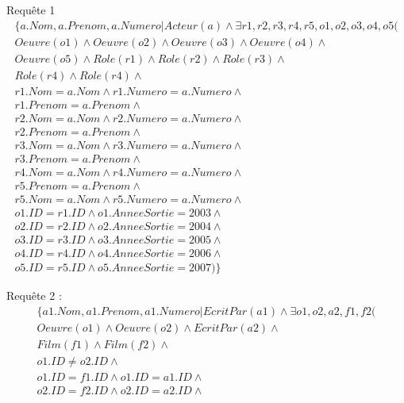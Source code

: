 \documentclass[10pt,a4paper]{article}
\begin{document}
\begin{list}{*}{}
\item Requête 1
\noindent
\[\begin{aligned}
      \{ a.Nom, a.Prenom, a.Numero | Acteur(a) \wedge \exists r1, r2, r3, r4, r5, o1, o2, o3, o4, o5 ( \\
       Oeuvre(o1) \wedge Oeuvre(o2) \wedge Oeuvre(o3) \wedge Oeuvre(o4) \wedge \\
       Oeuvre(o5) \wedge Role(r1) \wedge Role(r2) \wedge Role(r3) \wedge \\
       Role(r4) \wedge Role(r4)\wedge \\
       r1.Nom = a.Nom \wedge r1.Numero = a.Numero \wedge \\
       r1.Prenom = a.Prenom \wedge \\
       r2.Nom = a.Nom \wedge r2.Numero = a.Numero \wedge \\
       r2.Prenom = a.Prenom \wedge \\
       r3.Nom = a.Nom \wedge r3.Numero = a.Numero \wedge \\
       r3.Prenom = a.Prenom \wedge \\
       r4.Nom = a.Nom \wedge r4.Numero = a.Numero \wedge \\
       r5.Prenom = a.Prenom \wedge \\
       r5.Nom = a.Nom \wedge r5.Numero = a.Numero \wedge \\
       o1.ID = r1.ID \wedge o1.AnneeSortie = 2003 \wedge \\
       o2.ID = r2.ID \wedge o2.AnneeSortie = 2004 \wedge \\
       o3.ID = r3.ID \wedge o3.AnneeSortie = 2005 \wedge \\
       o4.ID = r4.ID \wedge o4.AnneeSortie = 2006 \wedge \\
       o5.ID = r5.ID \wedge o5.AnneeSortie = 2007) \}
\end{aligned}\]
\item Requête 2 :
\noindent
\[\begin{aligned}
\{ a1.Nom, a1.Prenom, a1.Numero | EcritPar(a1) \wedge \exists o1, o2, a2, f1, f2 ( \\
      Oeuvre(o1) \wedge Oeuvre(o2) \wedge EcritPar(a2) \wedge \\
       Film(f1) \wedge Film(f2) \wedge \\
       o1.ID \neq o2.ID \wedge \\
       o1.ID = f1.ID \wedge o1.ID = a1.ID \wedge \\
       o2.ID = f2.ID \wedge o2.ID = a2.ID \wedge \\

\end{aligned}\]
\end{list}
\end{document}
